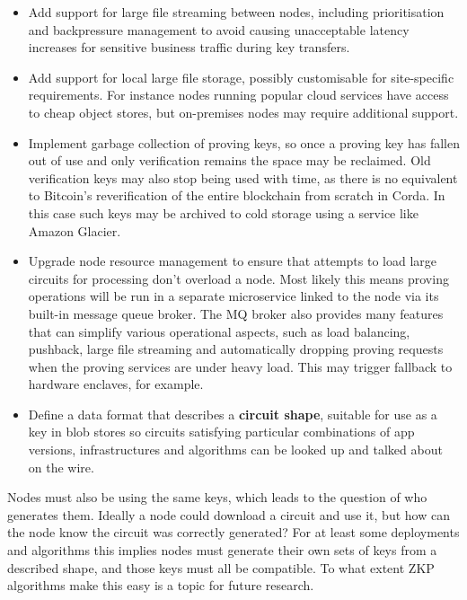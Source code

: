 \documentclass{article}
\begin{document}
\begin{itemize}

    \item Add support for large file streaming between nodes, including prioritisation and backpressure management
    to avoid causing unacceptable latency increases for sensitive business traffic during key transfers.

    \item Add support for local large file storage, possibly customisable for site-specific requirements. For
    instance nodes running popular cloud services have access to cheap object stores, but on-premises nodes may
    require additional support.

    \item Implement garbage collection of proving keys, so once a proving key has fallen out of use and only
    verification remains the space may be reclaimed. Old verification keys may also stop being used with time, as
    there is no equivalent to Bitcoin's reverification of the entire blockchain from scratch in Corda. In this case
    such keys may be archived to cold storage using a service like Amazon Glacier.

    \item Upgrade node resource management to ensure that attempts to load large circuits for processing don't
    overload a node. Most likely this means proving operations will be run in a separate microservice linked to the
    node via its built-in message queue broker. The MQ broker also provides many features that can simplify various
    operational aspects, such as load balancing, pushback, large file streaming and automatically dropping
    proving requests when the proving services are under heavy load. This may trigger fallback to hardware
    enclaves, for example.

    \item Define a data format that describes a \textbf{circuit shape}, suitable for use as a key in blob stores so
    circuits satisfying particular combinations of app versions, infrastructures and algorithms can be looked
    up and talked about on the wire.

\end{itemize}

Nodes must also be using the same keys, which leads to the question of who generates them. Ideally a node could
download a circuit and use it, but how can the node know the circuit was correctly generated? For at least some
deployments and algorithms this implies nodes must generate their own sets of keys from a described shape, and
those keys must all be compatible. To what extent ZKP algorithms make this easy is a topic for future research.
\end{document}
